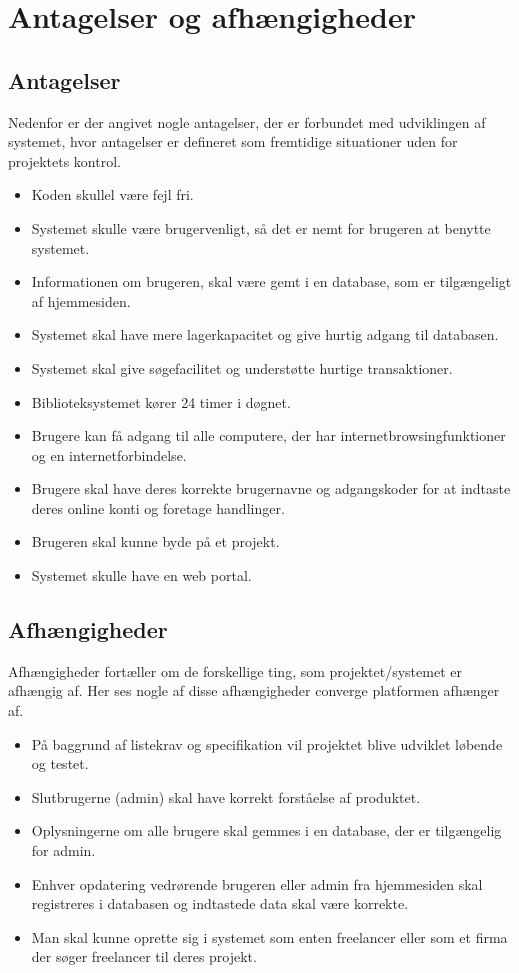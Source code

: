 \chapter{Antagelser og afhængigheder}

\section{Antagelser}
Nedenfor er der angivet nogle antagelser, der er forbundet med udviklingen af systemet, hvor antagelser er defineret som fremtidige situationer uden for projektets kontrol. 

\begin{itemize}
    \item Koden skullel være fejl fri.
    \item Systemet skulle være brugervenligt, så det er nemt for brugeren at benytte systemet.
    \item Informationen om brugeren, skal være gemt i en database, som er tilgængeligt af hjemmesiden.
    \item Systemet skal have mere lagerkapacitet og give hurtig adgang til databasen.
    \item Systemet skal give søgefacilitet og understøtte hurtige transaktioner.
    \item Biblioteksystemet kører 24 timer i døgnet.
    \item Brugere kan få adgang til alle computere, der har internetbrowsingfunktioner og en internetforbindelse.
    \item Brugere skal have deres korrekte brugernavne og adgangskoder for at indtaste deres online konti og foretage handlinger.
    \item Brugeren skal kunne byde på et projekt.
    \item Systemet skulle have en web portal.
     
  
\end{itemize}

\section{Afhængigheder}
Afhængigheder fortæller om de forskellige ting, som projektet/systemet er afhængig af. Her ses nogle af disse afhængigheder converge platformen afhænger af.
\begin{itemize}
    
    \item På baggrund af listekrav og specifikation vil projektet blive udviklet løbende og testet.
    \item Slutbrugerne (admin) skal have korrekt forståelse af produktet.
    \item  Oplysningerne om alle brugere skal gemmes i en database, der er tilgængelig for admin.
    \item Enhver opdatering vedrørende brugeren eller admin fra hjemmesiden skal registreres i databasen og indtastede data skal være korrekte.
    \item Man skal kunne oprette sig i systemet som enten freelancer eller som et firma der søger freelancer til deres projekt.

\end{itemize}



